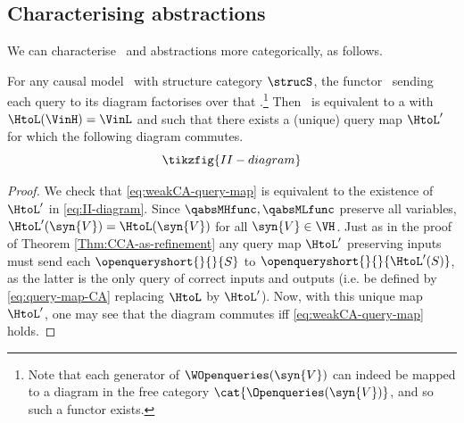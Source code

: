 \documentclass{article}
\begin{document}
{\subsection{Characterising abstractions}

We can characterise \ and \CF{} abstractions more categorically, as follows. 

\begin{lemma} \label{lem:weak-CA-chara}
For any causal model \ with structure category $\strucS$, the functor \ sending each query to its diagram factorises over that .\footnote{Note that each generator of $\WOpenqueries(\syn{V})$ can indeed be mapped to a diagram in the free category $\cat{\Openqueries(\syn{V})}$, and so such a functor exists.} 
 Then \ is equivalent to a 
\qdown{} with $\HtoL(\VinH) = \VinL$ and such that there exists a (unique) query map $\HtoL'$ for which the following diagram commutes. 
\begin{equation} \label{eq:II-diagram}
\tikzfig{II-diagram}
\end{equation}
\end{lemma}
\begin{proof}
We check that \eqref{eq:weakCA-query-map} is equivalent to the existence of $\HtoL'$ in \eqref{eq:II-diagram}. Since $\qabsMHfunc, \qabsMLfunc$ preserve all variables, $\HtoL'(\syn{V}) = \HtoL(\syn{V})$ for all $\syn{V} \in \VH$. Just as in the proof of Theorem \ref{Thm:CCA-as-refinement} any query map $\HtoL'$ preserving inputs must send each $\openqueryshort{}{}{S}$ to $\openqueryshort{}{}{\HtoL'(S)}$, as the latter is the only query of correct inputs and outputs (i.e. be defined by \eqref{eq:query-map-CA} replacing $\HtoL$ by $\HtoL'$). Now, with this unique map $\HtoL'$, one may see that the diagram commutes iff \eqref{eq:weakCA-query-map} holds. 
\end{proof}

}
\end{document}
